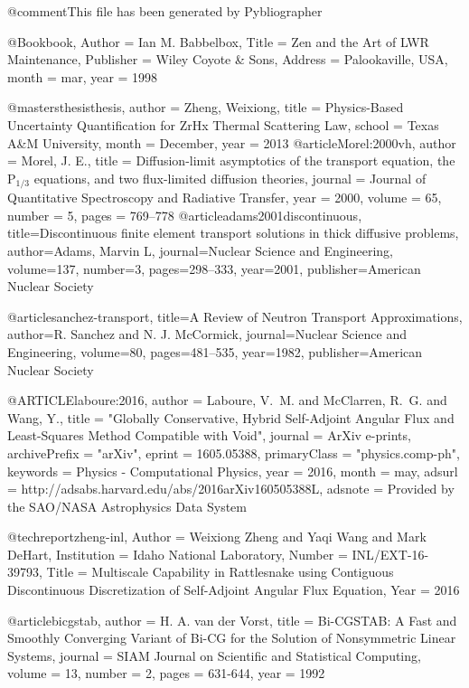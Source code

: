 
@comment{This file has been generated by Pybliographer}


@Book{book,
	Author         = {{Ian M. Babbelbox}},
	Title          = {Zen and the {A}rt of {LWR} {M}aintenance},
	Publisher      = {Wiley Coyote \& Sons},
	Address        = {Palookaville, USA},
	month          = mar,
	year           = 1998
}

@mastersthesis{thesis,
	author = {Zheng, Weixiong},
	title = {Physics-Based Uncertainty Quantification for ZrHx Thermal	Scattering Law},
	school = {Texas A\&M University},
	month = {December},
	year = {2013}
}
@article{Morel:2000vh,
author = {Morel, J. E.},
title = {{Diffusion-limit asymptotics of the transport equation, the P$_{1/3}$ equations, and two flux-limited diffusion theories}},
journal = {Journal of Quantitative Spectroscopy and Radiative Transfer},
year = {2000},
volume = {65},
number = {5},
pages = {769--778}
}
@article{adams2001discontinuous,
  title={Discontinuous finite element transport solutions in thick diffusive problems},
  author={Adams, Marvin L},
  journal={Nuclear Science and Engineering},
  volume={137},
  number={3},
  pages={298--333},
  year={2001},
  publisher={American Nuclear Society}
}

@article{sanchez-transport,
	title={A Review of Neutron Transport Approximations},
	author={R. Sanchez and N. J. McCormick},
	journal={Nuclear Science and Engineering},
	volume={80},
	pages={481--535},
	year={1982},
	publisher={American Nuclear Society}
}

@ARTICLE{laboure:2016,
   author = {{Laboure}, V.~M. and {McClarren}, R.~G. and {Wang}, Y.},
    title = "{Globally Conservative, Hybrid Self-Adjoint Angular Flux and Least-Squares Method Compatible with Void}",
  journal = {ArXiv e-prints},
archivePrefix = "arXiv",
   eprint = {1605.05388},
 primaryClass = "physics.comp-ph",
 keywords = {Physics - Computational Physics},
     year = 2016,
    month = may,
   adsurl = {http://adsabs.harvard.edu/abs/2016arXiv160505388L},
  adsnote = {Provided by the SAO/NASA Astrophysics Data System}
}

@techreport{zheng-inl,
	Author = {Weixiong Zheng and Yaqi Wang and Mark DeHart},
	Institution = {Idaho National Laboratory},
	Number = {INL/EXT-16-39793},
	Title = {Multiscale Capability in Rattlesnake using Contiguous Discontinuous Discretization of Self-Adjoint Angular Flux Equation},
	Year = {2016}}

@article{bicgstab,
	author = {H. A. van der Vorst},
	title = {Bi-CGSTAB: A Fast and Smoothly Converging Variant of Bi-CG for the Solution of Nonsymmetric Linear Systems},
	journal = {SIAM Journal on Scientific and Statistical Computing},
	volume = {13},
	number = {2},
	pages = {631-644},
	year = {1992}
}

